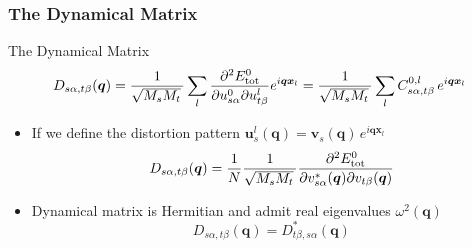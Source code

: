 \begin{frame}
  \frametitle{The Dynamical Matrix}
  The Dynamical Matrix
  \begin{equation*}
    \mathcolor{black}{
      D_{s\alpha,t\beta}(\boldsymbol{q})
    }
    =
    {1\over\sqrt{M_sM_t}\,}
    \mathcolor{black}{\sum_l}
    \mathcolor{black}{
      \frac{
      \partial^2 E^0_{\text{tot}}
      }{
      \partial {u}_{s\alpha}^0
      \partial {u}_{t\beta}^l
      }
      e^{i\boldsymbol{q}\boldsymbol{x}_l}
    }
    =
    {1\over\sqrt{M_sM_t}\,}
    \sum_l
    C_{s\alpha,t\beta}^{0, l}\,
    e^{i\boldsymbol{q}\boldsymbol{x}_l}
  \end{equation*}

  \begin{itemize}
  \item
    If we define the distortion pattern $\boldsymbol{u}^l_{s}(\boldsymbol{q}) =
    \boldsymbol{v}_{s}(\boldsymbol{q})\, e^{i\boldsymbol{q}\boldsymbol{x}_l}$
    \begin{equation*}
      D_{s\alpha,t\beta}(\boldsymbol{q})
      =
      {1 \over N}
      {1\over\sqrt{M_sM_t}\,}
      \frac{
      \partial^2 E^0_{\text{tot}}
      }{
      \partial {v}^*_{s\alpha}(\boldsymbol{q})
      \partial {v}_{t\beta}(\boldsymbol{q})
      }
    \end{equation*}
      
  \item Dynamical matrix is Hermitian and admit real eigenvalues $\omega^2(\boldsymbol{q})$
    \begin{equation*}
      D_{s\alpha,t\beta}(\boldsymbol{q})
      =
      D^*_{t\beta,s\alpha}(\boldsymbol{q})
    \end{equation*}
    

\end{itemize}
\end{frame}
